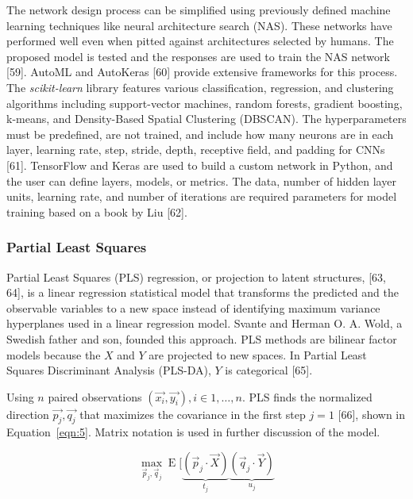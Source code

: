 \documentclass[sn-mathphys-num]{sn-jnl}%
\begin{document}
The network design process can be simplified using previously defined machine learning techniques like neural architecture search (NAS). These networks have performed well even when pitted against architectures selected by humans. The proposed model is tested and the responses are used to train the NAS network [59]. AutoML and AutoKeras [60] provide extensive frameworks for this process. The \textit{scikit-learn} library features various classification, regression, and clustering algorithms including support-vector machines, random forests, gradient boosting, k-means, and Density-Based Spatial Clustering (DBSCAN). The hyperparameters must be predefined, are not trained, and include how many neurons are in each layer, learning rate, step, stride, depth, receptive field, and padding for CNNs [61]. TensorFlow and Keras are used to build a custom network in Python, and the user can define layers, models, or metrics. The data, number of hidden layer units, learning rate, and number of iterations are required parameters for model training based on a book by Liu [62].

\subsubsection{Partial Least Squares}

Partial Least Squares (PLS) regression, or projection to latent structures, [63, 64], is a linear regression statistical model that transforms the predicted and the observable variables to a new space instead of identifying maximum variance hyperplanes used in a linear regression model. Svante and Herman O. A. Wold, a Swedish father and son, founded this approach. PLS methods are bilinear factor models because the $X$ and $Y$ are projected to new spaces. In Partial Least Squares Discriminant Analysis (PLS-DA), $Y$ is categorical [65].

Using $n$ paired observations $\left(\vec{x_{i}}, \vec{y_{i}}\right), i \in 1, \dots, n$. PLS finds the normalized direction $\vec{p_{j}}, \vec{q_{j}}$ that maximizes the covariance in the first step $j = 1$ [66], shown in Equation~\ref{eqn:5}. Matrix notation is used in further discussion of the model.

\begin{equation}
	\max_{{\vec{p}}_{j},{\vec{q}}_{j}}\operatorname{E} [\underbrace{({\vec{p}}_{j}\cdot {\vec{X}})}_{t_{j}}\underbrace{({\vec{q}}_{j}\cdot {\vec{Y}})}_{u_{j}}
	\label{eqn:5}
\end{equation}
\end{document}
